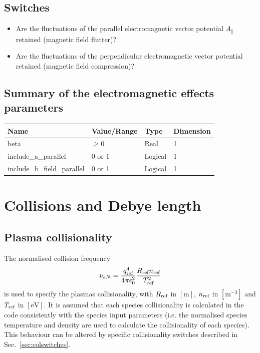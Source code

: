 \documentclass[a4paper]{report}
\begin{document}
\subsection{Switches}
\begin{itemize}
\item Are the fluctuations of the parallel electromagnetic vector potential $A_\parallel$ retained (magnetic field flutter)?
\item Are the fluctuations of the perpendicular electromagnetic vector potential retained (magnetic field compression)?
\end{itemize}

\subsection{Summary of the electromagnetic effects parameters}
\begin{tabularx}{\textwidth}{|X|Y|Y|Y|}
\hline
Name & Value/Range & Type & Dimension \\
\hline
beta & $\geq 0$ & Real & 1 \\
include\_a\_parallel & 0 or 1 & Logical & 1 \\
include\_b\_field\_parallel & 0 or 1 & Logical & 1 \\
\hline
\end{tabularx}

\section{Collisions and Debye length}
\subsection{Plasma collisionality}
The normalised collision frequency
\begin{equation}
 \nu_{eN} = \frac{q_{\textrm{ref}}^4}{4\pi\epsilon_0^2}\frac{R_{\textrm{ref}} n_{\textrm{ref}}}{T_{\textrm{ref}}^2}
\end{equation}
is used to specify the plasmas collisionality, with $R_{\textrm{ref}}$ in $[\textrm{m}]$, $n_{\textrm{ref}}$ in $[\textrm{m}^{-3}]$ and $T_{\textrm{ref}}$ in $[\textrm{eV}]$. It is assumed that each species collisionality is calculated in the code consistently with the species input parameters (i.e. the normalised species temperature and density are used to calculate the collisionality of each species). This behaviour can be altered by specific collisionality switches described in Sec.~\ref{sec:colswitches}.\\
\end{document}
